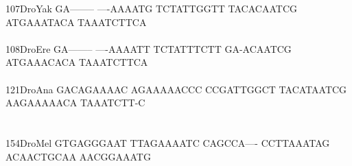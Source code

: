 \documentclass[11pt,twoside,reqno,a4paper]{article}
\begin{document}
{107\hspace*{1\charwidth}DroYak	GA--------	----AAAATG	TCTATTGGTT	TACACAATCG	ATGAAATACA	TAAATCTTCA	\\
\hspace*{4\charwidth}\hspace*{7\charwidth}\hspace*{1\charwidth}\hspace*{1\charwidth}\hspace*{1\charwidth}\hspace*{1\charwidth}\hspace*{1\charwidth}\hspace*{1\charwidth}\\
108\hspace*{1\charwidth}DroEre	GA--------	----AAAATT	TCTATTTCTT	GA-ACAATCG	ATGAAACACA	TAAATCTTCA	\\
\hspace*{4\charwidth}\hspace*{7\charwidth}\hspace*{1\charwidth}\hspace*{1\charwidth}\hspace*{1\charwidth}\hspace*{1\charwidth}\hspace*{1\charwidth}\hspace*{1\charwidth}\\
121\hspace*{1\charwidth}DroAna	GACAGAAAAC	AGAAAAACCC	CCGATTGGCT	TACATAATCG	AAGAAAAACA	TAAATCTT-C	\\
\hspace*{4\charwidth}\hspace*{7\charwidth}\hspace*{1\charwidth}\hspace*{1\charwidth}\hspace*{1\charwidth}\hspace*{1\charwidth}\hspace*{1\charwidth}\hspace*{1\charwidth}\\
\\
154\hspace*{1\charwidth}DroMel	GTGAGGGAAT	TTAGAAAATC	CAGCCA----	CCTTAAATAG	ACAACTGCAA	AACGGAAATG	\\
\hspace*{4\charwidth}\hspace*{7\charwidth}\hspace*{1\charwidth}\hspace*{1\charwidth}\hspace*{1\charwidth}\hspace*{1\charwidth}\hspace*{1\charwidth}\hspace*{1\charwidth}\\
}
\end{document}
